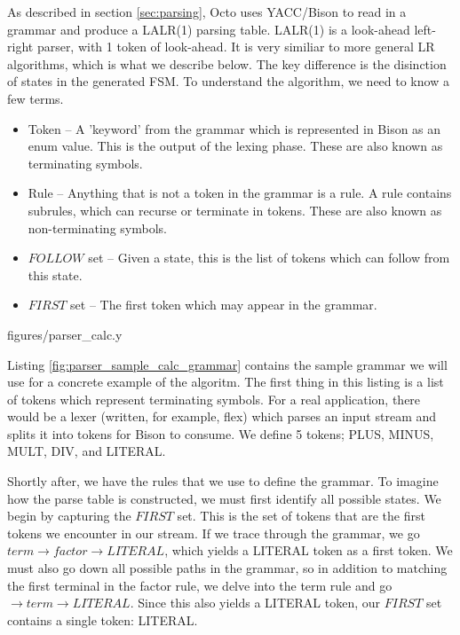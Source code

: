 \documentclass[]{article}
\begin{document}
As described in section \ref{sec:parsing}, Octo uses YACC/Bison to read in a grammar and produce a LALR(1) parsing table.
LALR(1) is a look-ahead left-right parser, with 1 token of look-ahead.
It is very similiar to more general LR algorithms, which is what we describe below.
The key difference is the disinction of states in the generated FSM.
To understand the algorithm, we need to know a few terms.

\begin{itemize}
	\item Token -- A 'keyword' from the grammar which is represented in Bison as an enum value. This is the output of the lexing phase. These are also known as terminating symbols.
	\item Rule -- Anything that is not a token in the grammar is a rule. A rule contains subrules, which can recurse or terminate in tokens. These are also known as non-terminating symbols.
	\item $FOLLOW$ set -- Given a state, this is the list of tokens which can follow from this state.
	\item $FIRST$ set -- The first token which may appear in the grammar.
\end{itemize}


{figures/parser_calc.y}

Listing \ref{fig:parser_sample_calc_grammar} contains the sample grammar we will use for a concrete example of the algoritm.
The first thing in this listing is a list of tokens which represent terminating symbols.
For a real application, there would be a lexer (written, for example, flex) which parses an input stream and splits it into tokens for Bison to consume.
We define 5 tokens; PLUS, MINUS, MULT, DIV, and LITERAL.

Shortly after, we have the rules that we use to define the grammar.
To imagine how the parse table is constructed, we must first identify all possible states.
We begin by capturing the $FIRST$ set.
This is the set of tokens that are the first tokens we encounter in our stream.
If we trace through the grammar, we go $term \rightarrow factor \rightarrow LITERAL$, which yields a LITERAL token as a first token.
We must also go down all possible paths in the grammar, so in addition to matching the first terminal in the factor rule, we delve into the term rule and go $\rightarrow term \rightarrow LITERAL$.
Since this also yields a LITERAL token, our $FIRST$ set contains a single token: LITERAL.
\end{document}
